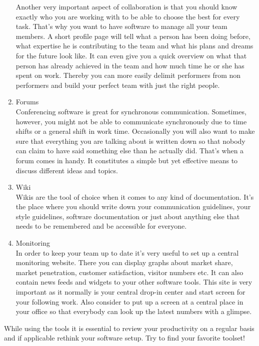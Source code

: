 \begin{multicols}{2}
\begin{enumerate}[1.]
Another very important aspect of collaboration is that you should know exactly who you are working with to be able to choose the best for every task. That’s why you want to have software to manage all your team members. A short profile page will tell what a person has been doing before, what expertise he is contributing to the team and what his plans and dreams for the future look like.
It can even give you a quick overview on what that person has already achieved in the team and how much time he or she has spent on work. Thereby you can more easily delimit performers from non performers and build your perfect team with just the right people.
	\item Forums\\
Conferencing software is great for synchronous communication. Sometimes, however, you might not be able to communicate synchronously due to time shifts or a general shift in work time. Occasionally you will also want to make sure that everything you are talking about is written down so that nobody can claim to have said something else than he actually did. That’s when a forum comes in handy.
It constitutes a simple but yet effective means to discuss different ideas and topics.
	\item Wiki\\
Wikis are the tool of choice when it comes to any kind of documentation. It’s the place where you should write down your communication guidelines, your style guidelines, software documentation or just about anything else that needs to be remembered and be accessible for everyone.
	\item Monitoring\\
In order to keep your team up to date it's very useful to set up a central monitoring website. There you can display graphs about market share, market penetration, customer satisfaction, visitor numbers etc. It can also contain news feeds and widgets to your other software tools. This site is very important as it normally is your central drop-in center and start screen for your following work. Also consider to put up a screen at a central place in your office so that everybody can look up the latest numbers with a glimpse.
\end{enumerate}

While using the tools it is essential to review your productivity on a regular basis and if applicable rethink your software setup. Try to find your favorite toolset!
\end{multicols}